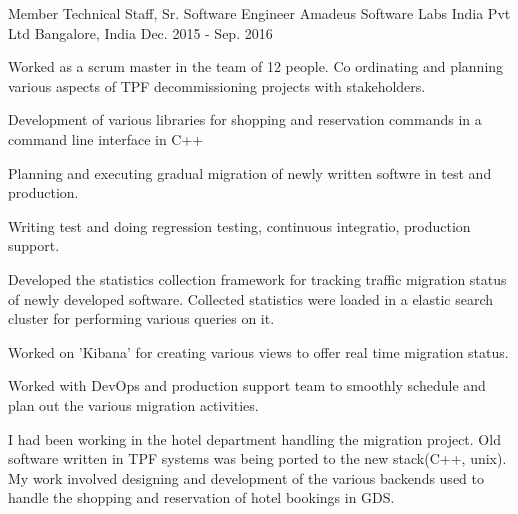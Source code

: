 \begin{cventries}
  \cventry
    {Member Technical Staff, Sr. Software Engineer} %
    {Amadeus Software Labs India Pvt Ltd} %
    {Bangalore, India} %
    {Dec. 2015 - Sep. 2016} %
    {
      \begin{cvitems} %
        \item {Worked as a scrum master in the team of 12 people. Co ordinating and planning various aspects of TPF decommissioning projects with stakeholders.}
        \item {Development of various libraries for shopping and reservation commands in a command line interface in C++}
        \item {Planning and executing gradual migration of newly written softwre in test and production.}
        \item {Writing test and doing regression testing, continuous integratio, production support.}
        \item {Developed the statistics collection framework for tracking traffic migration status of newly developed software. Collected statistics were loaded in a elastic search cluster for performing various queries on it.}
        \item {Worked on 'Kibana' for creating various views to offer real time migration status.}
        \item {Worked with DevOps and production support team to smoothly schedule and plan out the various migration activities.}
      \end{cvitems}
    }
    {
      \begin{cventrysummary}
        I had been working in the hotel department handling the migration project. Old software written in TPF systems was being ported to the new stack(C++, unix). My work involved designing and development of the various backends used to handle the shopping and reservation of hotel bookings in GDS.
      \end{cventrysummary}
    }


\end{cventries}
